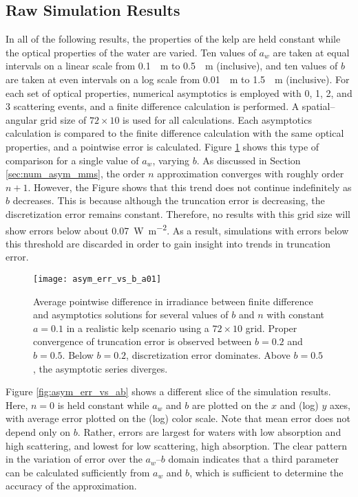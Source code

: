 \subsection{Raw Simulation Results}
\label{sec:iop_study_raw}
In all of the following results, the properties of the kelp are held constant while the optical properties of the water are varied.
Ten values of $a_w$ are taken at equal intervals on a linear scale from \SI{0.1}{\per\m} to \SI{0.5}{\per\m} (inclusive), and ten values of $b$ are taken at even intervals on a log scale from \SI{0.01}{\per\m} to \SI{1.5}{\per\m} (inclusive).
For each set of optical properties, numerical asymptotics is employed with 0, 1, 2, and 3 scattering events, and a finite difference calculation is performed.
A spatial--angular grid size of $72 \times 10$ is used for all calculations.
Each asymptotics calculation is compared to the finite difference calculation with the same optical properties, and a pointwise error is calculated.
Figure \ref{fig:asym_err_vs_b_a01} shows this type of comparison for a single value of $a_w$, varying $b$.
As discussed in Section \ref{sec:num_asym_mms}, the order $n$ approximation converges with roughly order $n+1$.
However, the Figure shows that this trend does not continue indefinitely as $b$ decreases.
This is because although the truncation error is decreasing, the discretization error remains constant.
Therefore, no results with this grid size will show errors below about \SI{0.07}{\W\per\m\squared}.
As a result, simulations with errors below this threshold are discarded in order to gain insight into trends in truncation error.

\newcommand\rdfigwidth{4.5in}

\begin{figure}[H]
  \centering
  \texttt{[image: asym\_err\_vs\_b\_a01]}
  \caption{Average pointwise difference in irradiance between finite difference and asymptotics solutions for several values of $b$ and $n$ with constant $a=0.1$ in a realistic kelp scenario using a $72\times 10$ grid. Proper convergence of truncation error is observed between $b=0.2$ and $b=0.5$. Below $b=0.2$, discretization error dominates. Above $b=0.5$, the asymptotic series diverges.}
  \label{fig:asym_err_vs_b_a01}
\end{figure}

Figure \ref{fig:asym_err_vs_ab} shows a different slice of the simulation results.
Here, $n=0$ is held constant while $a_w$ and $b$ are plotted on the $x$ and (log) $y$ axes, with average error plotted on the (log) color scale.
Note that mean error does not depend only on $b$.
Rather, errors are largest for waters with low absorption and high scattering, and lowest for low scattering, high absorption.
The clear pattern in the variation of error over the $a_w$--$b$ domain indicates that a third parameter can be calculated sufficiently from $a_w$ and $b$, which is sufficient to determine the accuracy of the approximation.

